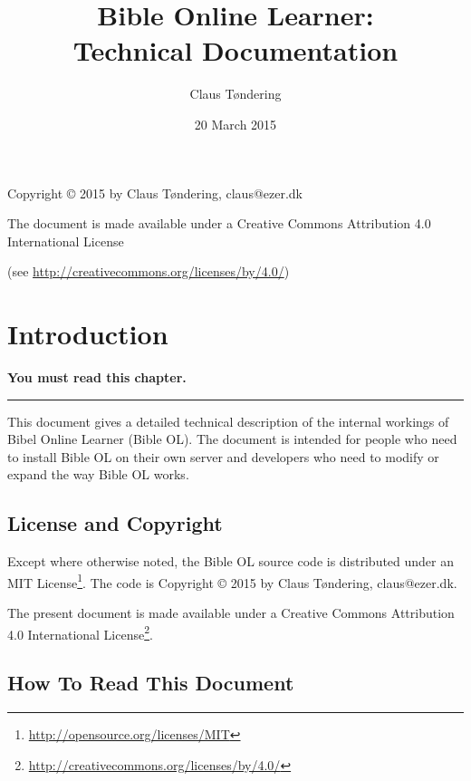 \documentclass[11pt,oneside,a4paper]{memoir}
\title{Bible Online Learner:\\Technical Documentation}
\author{Claus Tøndering}
\date{20 March 2015}
\begin{document}
\begin{titlingpage*}
\maketitle

\begin{center}
Copyright © 2015 by Claus Tøndering, claus@ezer.dk

\vspace{5mm}

The document is made available under a Creative Commons Attribution 4.0 International License

(see \url{http://creativecommons.org/licenses/by/4.0/})
\end{center}
\end{titlingpage*}


\clearpage
\tableofcontents
{} %

\chapter{Introduction}

\textbf{You must read this chapter.}
\plainbreak{3}

This document gives a detailed technical description of the internal workings of Bibel Online
Learner (Bible OL). The document is intended for people who need to install Bible OL on their own
server and developers who need to modify or expand the way Bible OL works.

\section{License and Copyright}

Except where otherwise noted, the Bible OL source code is distributed under an MIT
License\footnote{\url{http://opensource.org/licenses/MIT}}. The code is Copyright © 2015 by Claus
Tøndering, claus@ezer.dk.

The present document is made available under a Creative Commons Attribution 4.0 International License\footnote{\url{http://creativecommons.org/licenses/by/4.0/}}.


\section{How To Read This Document}
\end{document}
